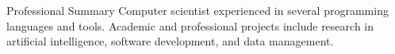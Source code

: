 \begin{rSection}{Professional Summary}
  Computer scientist experienced in several programming languages and tools. Academic and professional projects include research in artificial intelligence, software development, and data management.
\end{rSection}
